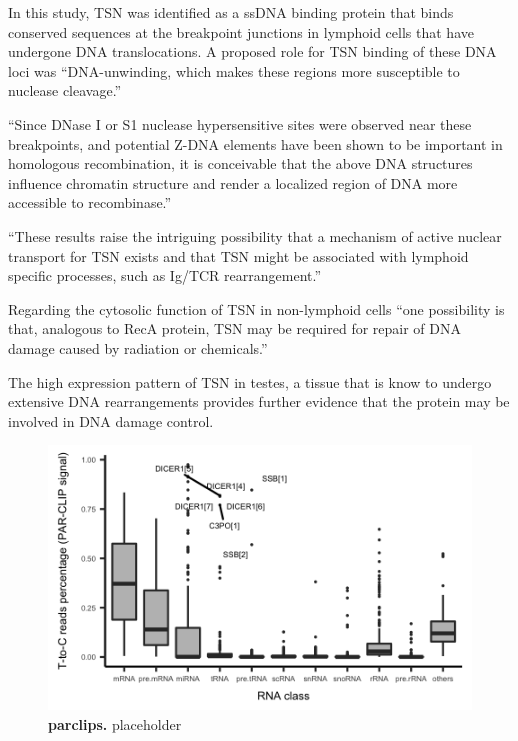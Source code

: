 \documentclass[12pt]{rockefeller}
\begin{document}
In this study, TSN was identified as a ssDNA binding protein that binds conserved sequences at the breakpoint junctions in lymphoid cells that have undergone DNA translocations. A proposed role for TSN binding of these DNA loci was “DNA-unwinding, which makes these regions more susceptible to nuclease cleavage.”

“Since DNase I or S1 nuclease hypersensitive sites were observed near these breakpoints, and potential Z-DNA elements have been shown to be important in homologous recombination, it is conceivable that the above DNA structures influence chromatin structure and render a localized region of DNA more accessible to recombinase.”

“These results raise the intriguing possibility that a mechanism of active nuclear transport for TSN exists and that TSN might be associated with lymphoid specific processes, such as Ig/TCR rearrangement.”

Regarding the cytosolic function of TSN in non-lymphoid cells “one possibility is that, analogous to RecA protein, TSN may be required for repair of DNA damage caused by radiation or chemicals.”

The high expression pattern of TSN in testes, a tissue that is know to undergo extensive DNA rearrangements provides further evidence that the protein may be involved in DNA damage control. 

\begin{figure}[!ht]%
\centering
\includegraphics[width = \textwidth]{parclips.png}%
\caption[parclips]
{\textbf{parclips.}
placeholder}
\centering
\label{parclips}%
\end{figure}
\end{document}
